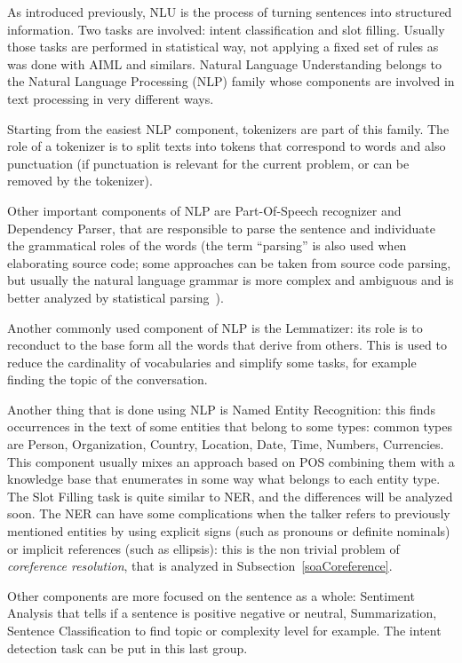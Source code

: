 As introduced previously, NLU is the process of turning sentences into structured information. Two tasks are involved: intent classification and slot filling. Usually those tasks are performed in statistical way, not applying a fixed set of rules as was done with AIML and similars. Natural Language Understanding belongs to the Natural Language Processing (NLP) family whose components are involved in text processing in very different ways.

Starting from the easiest NLP component, tokenizers are part of this family. The role of a tokenizer is to split texts into tokens that correspond to words and also punctuation (if punctuation is relevant for the current problem, or can be removed by the tokenizer).

Other important components of NLP are Part-Of-Speech recognizer and Dependency Parser, that are responsible to parse the sentence and individuate the grammatical roles of the words (the term ``parsing'' is also used when elaborating source code; some approaches can be taken from source code parsing, but usually the natural language grammar is more complex and ambiguous and is better analyzed by statistical parsing~\cite{ballesteros2015improved}).

Another commonly used component of NLP is the Lemmatizer: its role is to reconduct to the base form all the words that derive from others. This is used to reduce the cardinality of vocabularies and simplify some tasks, for example finding the topic of the conversation.

Another thing that is done using NLP is Named Entity Recognition: this finds occurrences in the text of some entities that belong to some types: common types are Person, Organization, Country, Location, Date, Time, Numbers, Currencies. This component usually mixes an approach based on POS combining them with a knowledge base that enumerates in some way what belongs to each entity type. The Slot Filling task is quite similar to NER, and the differences will be analyzed soon. The NER can have some complications when the talker refers to previously mentioned entities by using explicit signs (such as pronouns or definite nominals) or implicit references (such as ellipsis): this is the non trivial problem of \textit{coreference resolution}, that is analyzed in Subsection~\ref{soaCoreference}.

Other components are more focused on the sentence as a whole: Sentiment Analysis that tells if a sentence is positive negative or neutral, Summarization, Sentence Classification to find topic or complexity level for example. The intent detection task can be put in this last group.

